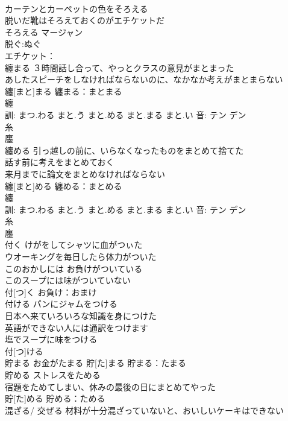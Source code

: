 \documentclass[8pt]{extreport}
\begin{document}
\begin{CJK}{UTF8}{min}
\\	カーテンとカーペットの色をそろえる 
\\	脱いだ靴はそろえておくのがエチケットだ 
\\	そろえる			マージャン
\\	脱ぐ:ぬぐ
\\	エチケット：
\\	纏まる	３時間話し合って、やっとクラスの意見がまとまった 
\\	あしたスピーチをしなければならないのに、なかなか考えがまとまらない 
\\	纏[まと]まる			纏まる：まとまる
\\	纏 
\\	訓: まつ.わる まと.う まと.める まと.まる まと.い 音: テン デン 
\\	糸 
\\	廛 
\\	纏める	引っ越しの前に、いらなくなったものをまとめて捨てた 
\\	話す前に考えをまとめておく 
\\	来月までに論文をまとめなければならない 
\\	纏[まと]める			纏める：まとめる
\\	纏 
\\	訓: まつ.わる まと.う まと.める まと.まる まと.い 音: テン デン 
\\	糸 
\\	廛 
\\	付く	けがをしてシャツに血がつぃた 
\\	ウオーキングを毎日したら体力がついた 
\\	このおかしには お負けがついている 
\\	このスープには味がついていない 
\\	付[つ]く			お負け：おまけ
\\	付ける	パンにジャムをつける 
\\	日本へ来ていろいろな知識を身につけた 
\\	英語ができない人には通訳をつけます 
\\	塩でスープに味をつける 
\\	付[つ]ける						
\\	貯まる	お金がたまる	貯[た]まる			貯まる：たまる
\\	貯める	ストレスをためる 
\\	宿題をためてしまい、休みの最後の日にまとめてやった 
\\	貯[た]める			貯める：ためる
\\	混ざる/ 交ぜる	材料が十分混ざっていないと、おいしいケーキはできない 

\end{CJK}
\end{document}
